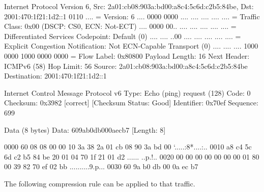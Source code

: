 \begin{termc}[backgroundcolor=\color{gray!10}, basicstyle=\ttfamily\tiny, escapechar=@]
Internet Protocol Version 6, Src: 2a01:cb08:903a:bd00:a8c4:5c6d:c2b5:84be, Dst: 
2001:470:1f21:1d2::1
    0110 .... = Version: 6
    .... 0000 0000 .... .... .... .... .... = Traffic Class: 0x00 (DSCP: CS0, ECN: Not-ECT)
        .... 0000 00.. .... .... .... .... .... = Differentiated Services Codepoint: Default (0)
        .... .... ..00 .... .... .... .... .... = Explicit Congestion Notification: Not ECN-Capable Transport (0)
    .... .... .... 1000 0000 1000 0000 0000 = Flow Label: 0x80800
    Payload Length: 16
    Next Header: ICMPv6 (58)
    Hop Limit: 56
    Source: 2a01:cb08:903a:bd00:a8c4:5c6d:c2b5:84be
    Destination: 2001:470:1f21:1d2::1
    
Internet Control Message Protocol v6
    Type: Echo (ping) request (128)
    Code: 0
    Checksum: 0x3982 [correct]
    [Checksum Status: Good]
    Identifier: 0x70ef
    Sequence: 699

    Data (8 bytes)
        Data: 609ab0db000aecb7
        [Length: 8]

0000  60 08 08 00 00 10 3a 38 2a 01 cb 08 90 3a bd 00   `.....:8*....:..
0010  a8 c4 5c 6d c2 b5 84 be 20 01 04 70 1f 21 01 d2   ..\m.... ..p.!..
0020  00 00 00 00 00 00 00 01 80 00 39 82 70 ef 02 bb   ..........9.p...
0030  60 9a b0 db 00 0a ec b7  
\end{termc}

The following compression rule can be applied to that traffic.

